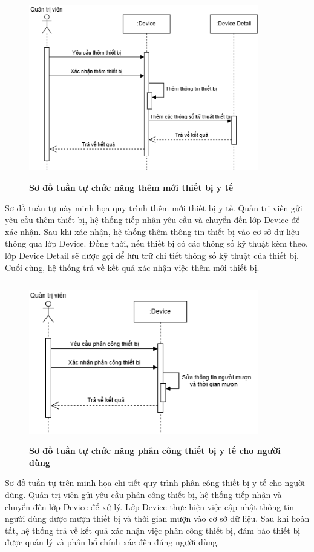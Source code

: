 \begin{figure}[H]
	\centering
	\includegraphics[width=10cm,height=8cm]{Images/sequence/device/add.drawio.png}
	\caption[Sơ đồ tuần tự chức năng thêm mới thiết bị y tế]{\bfseries \fontsize{12pt}{0pt}
		\selectfont Sơ đồ tuần tự chức năng thêm mới thiết bị y tế}
	\label{sequence_add_device} %
\end{figure}
Sơ đồ tuần tự này minh họa quy trình thêm mới thiết bị y tế. Quản trị viên gửi yêu cầu thêm thiết bị, hệ thống tiếp nhận yêu cầu và chuyển đến lớp Device để xác nhận.
Sau khi xác nhận, hệ thống thêm thông tin thiết bị vào cơ sở dữ liệu thông qua lớp Device. Đồng thời, nếu thiết bị có các thông số kỹ thuật kèm theo,
lớp Device Detail sẽ được gọi để lưu trữ chi tiết thông số kỹ thuật của thiết bị. Cuối cùng, hệ thống trả về kết quả xác nhận việc thêm mới thiết bị.

\begin{figure}[H]
	\centering
	\includegraphics[width=10cm,height=7cm]{Images/sequence/device/assign.drawio.png}
	\caption[Sơ đồ tuần tự chức năng phân công thiết bị y tế cho người dùng]{\bfseries \fontsize{12pt}{0pt}
		\selectfont Sơ đồ tuần tự chức năng phân công thiết bị y tế cho người dùng}
	\label{sequence_assign_device} %
\end{figure}
Sơ đồ tuần tự trên minh họa chi tiết quy trình phân công thiết bị y tế cho người dùng. Quản trị viên gửi yêu cầu phân công thiết bị, hệ thống tiếp nhận và chuyển đến lớp Device để xử lý.
Lớp Device thực hiện việc cập nhật thông tin người dùng được mượn thiết bị và thời gian mượn vào cơ sở dữ liệu. Sau khi hoàn tất, hệ thống trả về kết quả xác nhận việc phân công thiết bị,
đảm bảo thiết bị được quản lý và phân bổ chính xác đến đúng người dùng.


